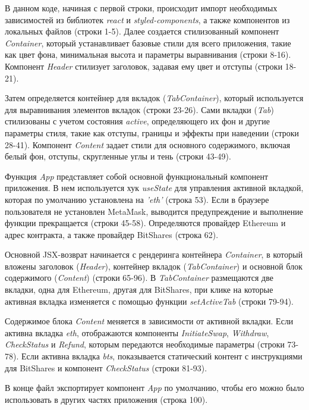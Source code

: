 В данном коде, начиная с первой строки, происходит импорт необходимых зависимостей из библиотек \textit{react} и \textit{styled-components}, а также компонентов из локальных файлов (строки 1-5). Далее создается стилизованный компонент \textit{Container}, который устанавливает базовые стили для всего приложения, такие как цвет фона, минимальная высота и параметры выравнивания (строки 8-16). Компонент \textit{Header} стилизует заголовок, задавая ему цвет и отступы (строки 18-21).

Затем определяется контейнер для вкладок (\textit{TabContainer}), который используется для выравнивания элементов вкладок (строки 23-26). Сами вкладки (\textit{Tab}) стилизованы с учетом состояния \textit{active}, определяющего их фон и другие параметры стиля, такие как отступы, границы и эффекты при наведении (строки 28-41). Компонент \textit{Content} задает стили для основного содержимого, включая белый фон, отступы, скругленные углы и тень (строки 43-49).

Функция \textit{App} представляет собой основной функциональный компонент приложения. В нем используется хук \textit{useState} для управления активной вкладкой, которая по умолчанию установлена на \textit{'eth'} (строка 53). Если в браузере пользователя не установлен MetaMask, выводится предупреждение и выполнение функции прекращается (строки 45-58). Определяются провайдер Ethereum и адрес контракта, а также провайдер BitShares (строка 62).

Основной JSX-возврат начинается с рендеринга контейнера \textit{Container}, в который вложены заголовок (\textit{Header}), контейнер вкладок (\textit{TabContainer}) и основной блок содержимого (\textit{Content}) (строки 65-96). В \textit{TabContainer} размещаются две вкладки, одна для Ethereum, другая для BitShares, при клике на которые активная вкладка изменяется с помощью функции \textit{setActiveTab} (строки 79-94). 

Содержимое блока \textit{Content} меняется в зависимости от активной вкладки. Если активна вкладка \textit{eth}, отображаются компоненты \textit{InitiateSwap}, \textit{Withdraw}, \textit{CheckStatus} и \textit{Refund}, которым передаются необходимые параметры (строки 73-78). Если активна вкладка \textit{bts}, показывается статический контент с инструкциями для BitShares и компонент \textit{CheckStatus} (строки 81-93).

В конце файл экспортирует компонент \textit{App} по умолчанию, чтобы его можно было использовать в других частях приложения (строка 100).

